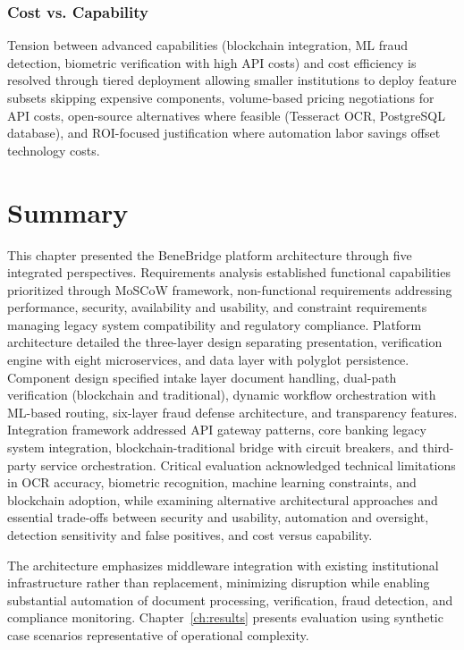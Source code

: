 \subsubsection{Cost vs. Capability}

Tension between advanced capabilities (blockchain integration, ML fraud detection, biometric verification with high API costs) and cost efficiency is resolved through tiered deployment allowing smaller institutions to deploy feature subsets skipping expensive components, volume-based pricing negotiations for API costs, open-source alternatives where feasible (Tesseract OCR, PostgreSQL database), and ROI-focused justification where automation labor savings offset technology costs.

\section{Summary}

This chapter presented the BeneBridge platform architecture through five integrated perspectives. Requirements analysis established functional capabilities prioritized through MoSCoW framework, non-functional requirements addressing performance, security, availability and usability, and constraint requirements managing legacy system compatibility and regulatory compliance. Platform architecture detailed the three-layer design separating presentation, verification engine with eight microservices, and data layer with polyglot persistence. Component design specified intake layer document handling, dual-path verification (blockchain and traditional), dynamic workflow orchestration with ML-based routing, six-layer fraud defense architecture, and transparency features. Integration framework addressed API gateway patterns, core banking legacy system integration, blockchain-traditional bridge with circuit breakers, and third-party service orchestration. Critical evaluation acknowledged technical limitations in OCR accuracy, biometric recognition, machine learning constraints, and blockchain adoption, while examining alternative architectural approaches and essential trade-offs between security and usability, automation and oversight, detection sensitivity and false positives, and cost versus capability.

The architecture emphasizes middleware integration with existing institutional infrastructure rather than replacement, minimizing disruption while enabling substantial automation of document processing, verification, fraud detection, and compliance monitoring. Chapter~\ref{ch:results} presents evaluation using synthetic case scenarios representative of operational complexity.
